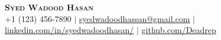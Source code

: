 \begin{center}
	\textbf{\Huge \scshape Syed Wadood Hasan} \\ \vspace{3.5pt}
    \small{+1 (123) 456-7890} $|$
    \href{mailto:syedwadoodhassan@gmail.com}{\underline{syedwadoodhassan@gmail.com}} $|$
	\href{https://www.linkedin.com/in/syedwadoodhasan-5a7bb21a8}{\underline{linkedin.com/in/syedwadoodhasan/}} $|$
	\href{https://github.com/Deadrep}{\underline{github.com/Deadrep}}
\end{center}